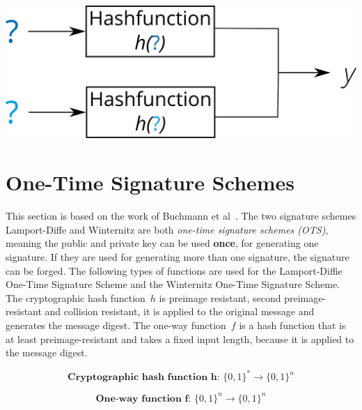 \begin{enumerate}
\begin{minipage}[t]{.6\linewidth}
          	\raggedright
            \includegraphics[width=.8\linewidth]{images/Background/collission_res_horizontal.png}
	      \end{minipage}
	      
\end{enumerate}	      


\section{One-Time Signature Schemes}
\label{sec:one-time_sign_schemes}
This section is based on the work of Buchmann et al~\cite{book_pqc_bernstein_2004}. 
The two signature schemes Lamport-Diffe and Winternitz are both \textit{one-time signature schemes (OTS)}, meaning the public and private key can be used \textbf{once}, for generating one signature. If they are used for generating more than one signature, the signature can be forged. %
The following types of functions are used for the Lamport-Diffie One-Time Signature Scheme and the Winternitz One-Time Signature Scheme. 
The cryptographic hash function~$h$ is preimage resistant, second preimage-resistant and collision resistant, it is applied to the original message and generates the message digest.
The one-way function~$f$ is a hash function that is at least preimage-resistant and takes a fixed input length, because it is applied to the message digest.%

\begin{equation}
\label{eq:basic_hashfunc}
\textbf{Cryptographic hash function h: } \lbrace 0,1 \rbrace^* \rightarrow \lbrace 0,1 \rbrace^n
\end{equation}

\begin{equation}
\label{eq:one-way-func}
\textbf{One-way function f: } \lbrace 0,1 \rbrace^n \rightarrow \lbrace 0,1 \rbrace ^n
\end{equation}


